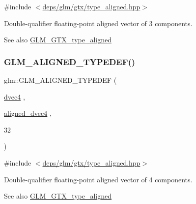 {\ttfamily \#include $<$\hyperlink{gtx_2type__aligned_8hpp}{deps/glm/gtx/type\+\_\+aligned.\+hpp}$>$}

Double-\/qualifier floating-\/point aligned vector of 3 components. \begin{DoxySeeAlso}{See also}
\hyperlink{group__gtx__type__aligned}{G\+L\+M\+\_\+\+G\+T\+X\+\_\+type\+\_\+aligned} 
\end{DoxySeeAlso}
\mbox{\label{group__gtx__type__aligned_ga687d5b8f551d5af32425c0b2fba15e99}} 
\subsubsection{\texorpdfstring{G\+L\+M\+\_\+\+A\+L\+I\+G\+N\+E\+D\+\_\+\+T\+Y\+P\+E\+D\+E\+F()}{GLM\_ALIGNED\_TYPEDEF()}\hspace{0.1cm}{\footnotesize\ttfamily [158/209]}}
{\footnotesize\ttfamily glm\+::\+G\+L\+M\+\_\+\+A\+L\+I\+G\+N\+E\+D\+\_\+\+T\+Y\+P\+E\+D\+EF (\begin{DoxyParamCaption}\item[{\hyperlink{group__core__types_ga0824ceed7ec3b2fba89765501c1540b5}{dvec4}}]{,  }\item[{\hyperlink{group__gtc__type__aligned_ga502d8d084a488118c9a5466d73ba1a46}{aligned\+\_\+dvec4}}]{,  }\item[{32}]{ }\end{DoxyParamCaption})}



{\ttfamily \#include $<$\hyperlink{gtx_2type__aligned_8hpp}{deps/glm/gtx/type\+\_\+aligned.\+hpp}$>$}

Double-\/qualifier floating-\/point aligned vector of 4 components. \begin{DoxySeeAlso}{See also}
\hyperlink{group__gtx__type__aligned}{G\+L\+M\+\_\+\+G\+T\+X\+\_\+type\+\_\+aligned} 
\end{DoxySeeAlso}
\mbox{\label{group__gtx__type__aligned_ga8e842371d46842ff8f1813419ba49d0f}} 
